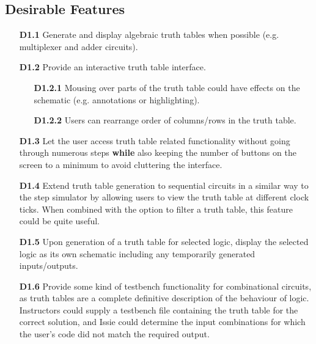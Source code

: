 \subsection*{Desirable Features}
\begin{itemize}
    \item[\textbf{D1.1}] Generate and display algebraic truth tables when possible (e.g. multiplexer and adder circuits).
    \medskip
    \item[\textbf{D1.2}] Provide an interactive truth table interface.
    \begin{itemize}
        \item[\textbf{D1.2.1}] Mousing over parts of the truth table could have effects on the schematic (e.g. annotations or highlighting).
        \item[\textbf{D1.2.2}] Users can rearrange order of columns/rows in the truth table.
    \end{itemize}
    \medskip
    \item[\textbf{D1.3}] Let the user access truth table related functionality without going through numerous steps \textbf{while} also keeping the number of buttons on the screen to a minimum to avoid cluttering the interface. 
    \medskip
    \item[\textbf{D1.4}] Extend truth table generation to sequential circuits in a similar way to the step simulator by allowing users to view the truth table at different clock ticks. When combined with the option to filter a truth table, this feature could be quite useful.
    \medskip
    \item[\textbf{D1.5}] Upon generation of a truth table for selected logic, display the selected logic as its own schematic including any temporarily generated inputs/outputs.
    \medskip
    \item[\textbf{D1.6}] Provide some kind of testbench functionality for combinational circuits, as truth tables are a complete definitive description of the behaviour of logic. Instructors could supply a testbench file containing the truth table for the correct solution, and Issie could determine the input combinations for which the user's code did not match the required output.
    \medskip
\end{itemize}


